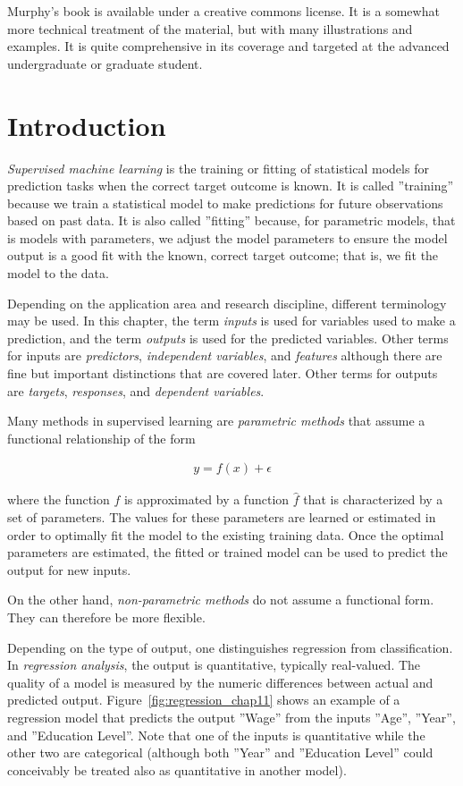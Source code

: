 Murphy's book is available under a creative commons license. It is a somewhat more technical treatment of the material, but with many illustrations and examples. It is quite comprehensive in its coverage and targeted at the advanced undergraduate or graduate student. 

\section{Introduction}

\emph{Supervised machine learning} is the training or fitting of statistical models for prediction tasks when the correct target outcome is known. It is called ''training'' because we train a statistical model to make predictions for future observations based on past data. It is also called ''fitting'' because, for parametric models, that is models with parameters, we adjust the model parameters to ensure the model output is a good fit with the known, correct target outcome; that is, we fit the model to the data. 

Depending on the application area and research discipline, different terminology may be used. In this chapter, the term \emph{inputs} is used for variables used to make a prediction, and the term \emph{outputs} is used for the predicted variables. Other terms for inputs are \emph{predictors}, \emph{independent variables}, and \emph{features} although there are fine but important distinctions that are covered later. Other terms for outputs are \emph{targets}, \emph{responses}, and \emph{dependent variables}.

Many methods in supervised learning are \emph{parametric methods} that assume a functional relationship of the form 

\begin{align*}
y = f(x) + \epsilon
\end{align*}

\noindent where the function $f$ is approximated by a function $\hat{f}$ that is characterized by a set of parameters. The values for these parameters are learned or estimated in order to optimally fit the model to the existing training data. Once the optimal parameters are estimated, the fitted or trained model can be used to predict the output for new inputs.

On the other hand, \emph{non-parametric methods} do not assume a functional form. They can therefore be more flexible. 

Depending on the type of output, one distinguishes regression from classification. In \emph{regression analysis}, the output is quantitative, typically real-valued. The quality of a model is measured by the numeric differences between actual and predicted output. Figure~\ref{fig:regression_chap11} shows an example of a regression model that predicts the output ''Wage'' from the inputs ''Age'', ''Year'', and ''Education Level''. Note that one of the inputs is quantitative while the other two are categorical (although both ''Year'' and ''Education Level'' could conceivably be treated also as quantitative in another model).

